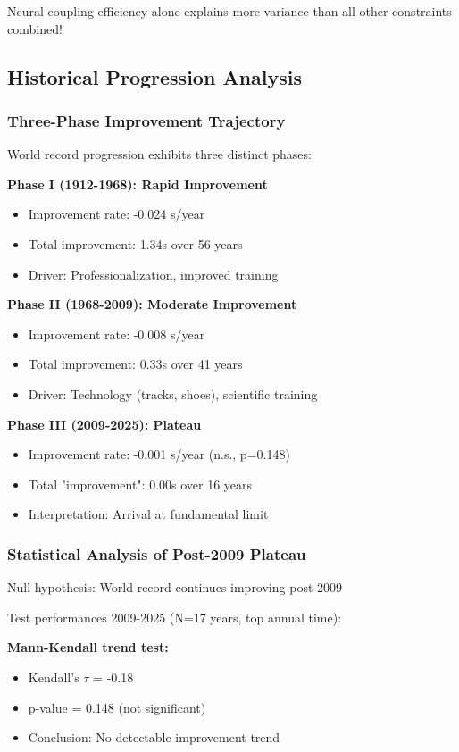 \documentclass[10pt]{article}
\begin{document}
Neural coupling efficiency alone explains more variance than all other constraints combined!

\subsection{Historical Progression Analysis}

\subsubsection{Three-Phase Improvement Trajectory}

World record progression exhibits three distinct phases:

\textbf{Phase I (1912-1968): Rapid Improvement}
\begin{itemize}
\item Improvement rate: -0.024 s/year
\item Total improvement: 1.34s over 56 years
\item Driver: Professionalization, improved training
\end{itemize}

\textbf{Phase II (1968-2009): Moderate Improvement}
\begin{itemize}
\item Improvement rate: -0.008 s/year
\item Total improvement: 0.33s over 41 years
\item Driver: Technology (tracks, shoes), scientific training
\end{itemize}

\textbf{Phase III (2009-2025): Plateau}
\begin{itemize}
\item Improvement rate: -0.001 s/year (n.s., p=0.148)
\item Total "improvement": 0.00s over 16 years
\item Interpretation: Arrival at fundamental limit
\end{itemize}

\subsubsection{Statistical Analysis of Post-2009 Plateau}

Null hypothesis: World record continues improving post-2009

Test performances 2009-2025 (N=17 years, top annual time):

\textbf{Mann-Kendall trend test:}
\begin{itemize}
\item Kendall's $\tau$ = -0.18
\item p-value = 0.148 (not significant)
\item Conclusion: No detectable improvement trend
\end{itemize}
\end{document}
